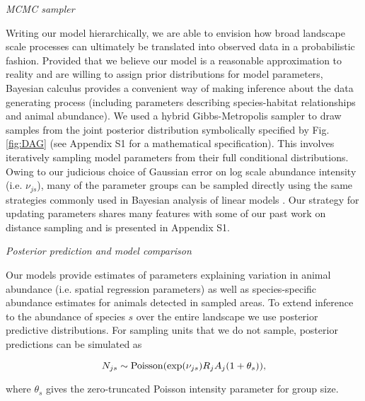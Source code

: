 \documentclass[12pt,fleqn]{article}
\begin{document}
\begin{flushleft}
\vspace{.15in}
{\it MCMC sampler} \\
\vspace{.15in}

\hspace{.5in}Writing our model hierarchically, we are able to envision how broad landscape scale processes can ultimately be translated into observed data in a probabilistic fashion.  Provided that we believe our model is a reasonable approximation to reality and are willing to assign prior distributions for model parameters, Bayesian calculus provides a convenient way of making inference about the data generating process (including parameters describing species-habitat relationships and animal abundance). We used a hybrid Gibbs-Metropolis sampler to draw samples from the joint posterior distribution symbolically specified by Fig. \ref{fig:DAG} (see Appendix S1 for a mathematical specification).  This involves iteratively sampling model parameters from their full conditional distributions.  Owing to our judicious choice of Gaussian error on log scale abundance intensity (i.e. $\nu_{js}$), many of the parameter groups can be sampled directly using the same strategies commonly used in Bayesian analysis of linear models \cite[see e.g.][Chapter 14]{GelmanEtAl2004}.  Our strategy for updating parameters shares many features with some of our past work on distance sampling \citep[see e.g.][]{ConnEtAl2012,ConnEtAl2013} and is presented in Appendix S1.

\vspace{.15in}
{\it Posterior prediction and model comparison} \\
\vspace{.15in}

\hspace{.5in}Our models provide estimates of parameters explaining variation in animal abundance (i.e. spatial regression parameters) as well
as species-specific abundance estimates for animals detected in sampled areas.  To extend inference to the abundance of species $s$ over the entire landscape we use posterior predictive distributions.  For sampling units that we do not sample, posterior predictions can be simulated as
\begin{linenomath*}
\begin{equation*}
  N_{js} \sim {\rm Poisson} (\exp(\nu_{js}) R_j A_j (1 + \theta_s)),
\end{equation*}
\end{linenomath*}
where $\theta_s$ gives the zero-truncated Poisson intensity parameter for group size.


\end{flushleft}
\end{document}

